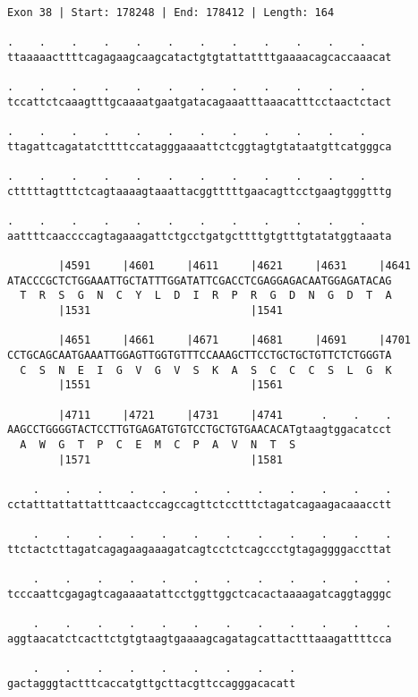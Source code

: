 \documentclass{article}
\begin{document}
\begin{Verbatim}
Exon 38 | Start: 178248 | End: 178412 | Length: 164
 
.    .    .    .    .    .    .    .    .    .    .    .    
ttaaaaacttttcagagaagcaagcatactgtgtattattttgaaaacagcaccaaacat
  
.    .    .    .    .    .    .    .    .    .    .    .    
tccattctcaaagtttgcaaaatgaatgatacagaaatttaaacatttcctaactctact
  
.    .    .    .    .    .    .    .    .    .    .    .    
ttagattcagatatcttttccatagggaaaattctcggtagtgtataatgttcatgggca
  
.    .    .    .    .    .    .    .    .    .    .    .    
ctttttagtttctcagtaaaagtaaattacggtttttgaacagttcctgaagtgggtttg
  
.    .    .    .    .    .    .    .    .    .    .    .    
aattttcaaccccagtagaaagattctgcctgatgcttttgtgtttgtatatggtaaata
  
        |4591     |4601     |4611     |4621     |4631     |4641
ATACCCGCTCTGGAAATTGCTATTTGGATATTCGACCTCGAGGAGACAATGGAGATACAG
  T  R  S  G  N  C  Y  L  D  I  R  P  R  G  D  N  G  D  T  A
        |1531                         |1541                 
  
        |4651     |4661     |4671     |4681     |4691     |4701
CCTGCAGCAATGAAATTGGAGTTGGTGTTTCCAAAGCTTCCTGCTGCTGTTCTCTGGGTA
  C  S  N  E  I  G  V  G  V  S  K  A  S  C  C  C  S  L  G  K
        |1551                         |1561                 
  
        |4711     |4721     |4731     |4741      .    .    .
AAGCCTGGGGTACTCCTTGTGAGATGTGTCCTGCTGTGAACACATgtaagtggacatcct
  A  W  G  T  P  C  E  M  C  P  A  V  N  T  S               
        |1571                         |1581                 
  
    .    .    .    .    .    .    .    .    .    .    .    .
cctatttattattatttcaactccagccagttctcctttctagatcagaagacaaacctt
  
    .    .    .    .    .    .    .    .    .    .    .    .
ttctactcttagatcagagaagaaagatcagtcctctcagccctgtagaggggaccttat
  
    .    .    .    .    .    .    .    .    .    .    .    .
tcccaattcgagagtcagaaaatattcctggttggctcacactaaaagatcaggtagggc
  
    .    .    .    .    .    .    .    .    .    .    .    .
aggtaacatctcacttctgtgtaagtgaaaagcagatagcattactttaaagattttcca
  
    .    .    .    .    .    .    .    .    .
gactagggtactttcaccatgttgcttacgttccagggacacatt
\end{Verbatim}
\end{document}
